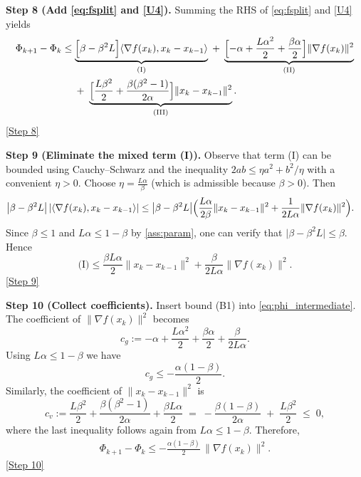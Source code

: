 \documentclass[11pt]{article}
\begin{document}
\medskip
\noindent\textbf{Step 8 (Add \eqref{eq:fsplit} and \eqref{U4}).}
Summing the RHS of \eqref{eq:fsplit} and \eqref{U4} yields
\begin{align}
\Phi_{k+1}-\Phi_{k}
&\le
\underbrace{\Bigl[\beta-\beta^{2}L\Bigr]\langle\nabla f(x_{k}),x_{k}-x_{k-1}\rangle}_{\text{(I)}}
\;+\;
\underbrace{\Bigl[-\alpha+\frac{L\alpha^{2}}{2}+\frac{\beta\alpha}{2}\Bigr]\|\nabla f(x_{k})\|^{2}}_{\text{(II)}}\nonumber\\
&\quad
\;+\;
\underbrace{\Bigl[\frac{L\beta^{2}}{2}+\frac{\beta(\beta^{2}-1)}{2\alpha}\Bigr]\|x_{k}-x_{k-1}\|^{2}}_{\text{(III)}} .
\label{eq:phi_intermediate}
\end{align}
\underline{[Step 8]}

\medskip
\noindent\textbf{Step 9 (Eliminate the mixed term (I)).}  
Observe that term (I) can be bounded using Cauchy–Schwarz and the inequality
$2ab\le \eta a^{2}+b^{2}/\eta$ with a convenient $\eta>0$.
Choose $\eta=\frac{L\alpha}{\beta}$ (which is admissible because $\beta>0$).
Then
\begin{align}
\bigl|\beta-\beta^{2}L\bigr|\,
|\langle\nabla f(x_{k}),x_{k}-x_{k-1}\rangle|
&\le
\bigl|\beta-\beta^{2}L\bigr|
\Bigl(\frac{L\alpha}{2\beta}\|x_{k}-x_{k-1}\|^{2}
      +\frac{1}{2L\alpha}\|\nabla f(x_{k})\|^{2}\Bigr). \label{eq:mix_bound}
\end{align}
Since $\beta\le 1$ and $L\alpha\le 1-\beta$ by \eqref{ass:param},
one can verify that $\bigl|\beta-\beta^{2}L\bigr|\le\beta$.
Hence
\[
\text{(I)}\le
\frac{\beta L\alpha}{2}\|x_{k}-x_{k-1}\|^{2}
+\frac{\beta}{2L\alpha}\|\nabla f(x_{k})\|^{2}.
\tag{B1}
\]
\underline{[Step 9]}

\medskip
\noindent\textbf{Step 10 (Collect coefficients).}
Insert bound (B1) into \eqref{eq:phi_intermediate}.  The coefficient of
$\|\nabla f(x_{k})\|^{2}$ becomes
\[
c_{g}:=
-\alpha+\frac{L\alpha^{2}}{2}+\frac{\beta\alpha}{2}
+\frac{\beta}{2L\alpha}.
\]
Using $L\alpha\le 1-\beta$ we have
\[
c_{g}\le -\frac{\alpha(1-\beta)}{2}.
\tag{B2}
\]
Similarly, the coefficient of $\|x_{k}-x_{k-1}\|^{2}$ is
\[
c_{v}:=
\frac{L\beta^{2}}{2}
+\frac{\beta(\beta^{2}-1)}{2\alpha}
+\frac{\beta L\alpha}{2}
\;=\;
-\frac{\beta(1-\beta)}{2\alpha}\;+\;\frac{L\beta^{2}}{2}
\;\le\;0,
\tag{B3}
\]
where the last inequality follows again from $L\alpha\le 1-\beta$.
Therefore,
\begin{align}
\Phi_{k+1}-\Phi_{k}
\le -\frac{\alpha(1-\beta)}{2}\,\|\nabla f(x_{k})\|^{2}.
\tag{D1}
\end{align}
\underline{[Step 10]}
\end{document}
